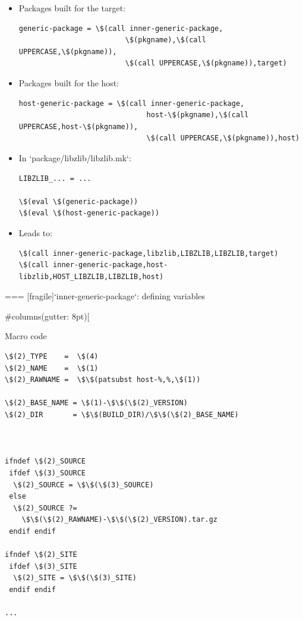 \begin{itemize}
\item Packages built for the target:
\begin{block}{}
\begin{verbatim}
generic-package = \$(call inner-generic-package,
                         \$(pkgname),\$(call UPPERCASE,\$(pkgname)),
                         \$(call UPPERCASE,\$(pkgname)),target)
\end{verbatim}
\end{block}

\item Packages built for the host:
\begin{block}{}
\begin{verbatim}
host-generic-package = \$(call inner-generic-package,
                              host-\$(pkgname),\$(call UPPERCASE,host-\$(pkgname)),
                              \$(call UPPERCASE,\$(pkgname)),host)
\end{verbatim}
\end{block}

\item In `package/libzlib/libzlib.mk`:
\begin{block}{}
\begin{verbatim}
LIBZLIB_... = ...

\$(eval \$(generic-package))
\$(eval \$(host-generic-package))
\end{verbatim}
\end{block}

\item Leads to:
\begin{block}{}
\begin{verbatim}
\$(call inner-generic-package,libzlib,LIBZLIB,LIBZLIB,target)
\$(call inner-generic-package,host-libzlib,HOST_LIBZLIB,LIBZLIB,host)
\end{verbatim}
\end{block}

\end{itemize}



=== [fragile]{`inner-generic-package`: defining variables}


#columns(gutter: 8pt)[
\begin{block}{Macro code}
\begin{verbatim}
\$(2)_TYPE    =  \$(4)
\$(2)_NAME    =  \$(1)
\$(2)_RAWNAME =  \$\$(patsubst host-%,%,\$(1))

\$(2)_BASE_NAME = \$(1)-\$\$(\$(2)_VERSION)
\$(2)_DIR       = \$\$(BUILD_DIR)/\$\$(\$(2)_BASE_NAME)



ifndef \$(2)_SOURCE
 ifdef \$(3)_SOURCE
  \$(2)_SOURCE = \$\$(\$(3)_SOURCE)
 else
  \$(2)_SOURCE ?=
    \$\$(\$(2)_RAWNAME)-\$\$(\$(2)_VERSION).tar.gz
 endif endif

ifndef \$(2)_SITE
 ifdef \$(3)_SITE
  \$(2)_SITE = \$\$(\$(3)_SITE)
 endif endif

...
\end{verbatim}
\end{block}


